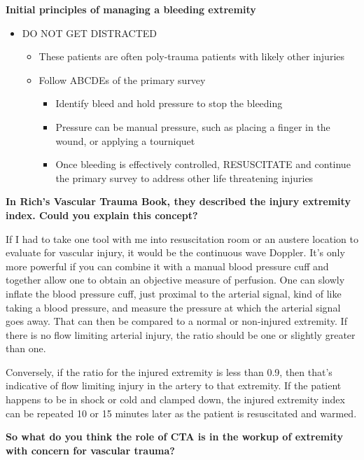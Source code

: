 \documentclass[
]{book}
\providecommand{\tightlist}{%
  \setlength{\itemsep}{0pt}\setlength{\parskip}{0pt}}
\begin{document}
\textbf{Initial principles of managing a bleeding extremity}

\begin{itemize}
\tightlist
\item
  DO NOT GET DISTRACTED

  \begin{itemize}
  \tightlist
  \item
    These patients are often poly-trauma patients with likely other
    injuries
  \item
    Follow ABCDEs of the primary survey

    \begin{itemize}
    \tightlist
    \item
      Identify bleed and hold pressure to stop the bleeding
    \item
      Pressure can be manual pressure, such as placing a finger in
      the wound, or applying a tourniquet
    \item
      Once bleeding is effectively controlled, RESUSCITATE and
      continue the primary survey to address other life
      threatening injuries
    \end{itemize}
  \end{itemize}
\end{itemize}

\textbf{In Rich's Vascular Trauma Book, they described the injury extremity
index. Could you explain this concept?}

If I had to take one tool with me into resuscitation room or an austere
location to evaluate for vascular injury, it would be the continuous
wave Doppler. It's only more powerful if you can combine it with a
manual blood pressure cuff and together allow one to obtain an objective
measure of perfusion. One can slowly inflate the blood pressure cuff,
just proximal to the arterial signal, kind of like taking a blood
pressure, and measure the pressure at which the arterial signal goes
away. That can then be compared to a normal or non-injured extremity. If
there is no flow limiting arterial injury, the ratio should be one or
slightly greater than one.

Conversely, if the ratio for the injured extremity is less than 0.9,
then that's indicative of flow limiting injury in the artery to that
extremity. If the patient happens to be in shock or cold and clamped
down, the injured extremity index can be repeated 10 or 15 minutes later
as the patient is resuscitated and warmed.\citep{rasmussen2022}

\textbf{So what do you think the role of CTA is in the workup of extremity
with concern for vascular trauma?}
\end{document}
